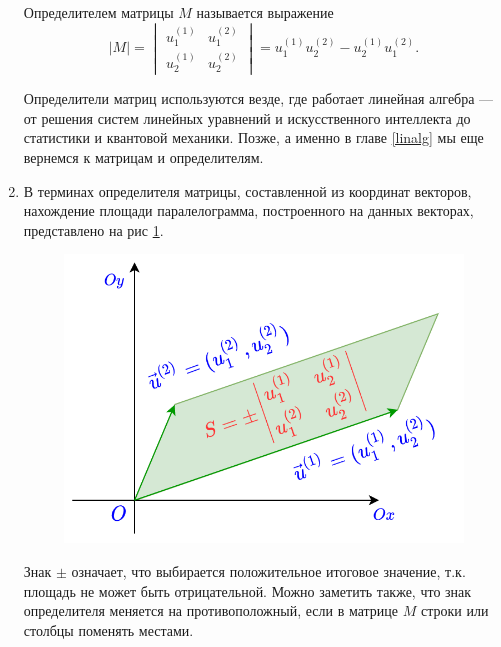 \begin{enumerate}
Определителем матрицы $M$ называется выражение
$$
|M| =
\begin{vmatrix}
u_1^{(1)} & u_1^{(2)} \\
u_2^{(1)} & u_2^{(2)}
\end{vmatrix} = u^{(1)}_1u^{(2)}_2-u^{(1)}_2u^{(2)}_1.
$$

Определители матриц используются везде, где работает линейная алгебра --- от решения систем линейных уравнений и искусственного интеллекта до статистики и квантовой механики. Позже, а именно в главе \ref{linalg} мы еще вернемся к матрицам и определителям.

\item В терминах определителя матрицы, составленной из координат векторов, нахождение площади паралелограмма, построенного на данных векторах, представлено на рис \ref{paralel2}.
\begin{figure}[hbt!]
\begin{center}
\includegraphics[scale=0.4]{paralel2.png}
\end{center}
\caption{}\label{paralel2}
\end{figure}

Знак $\pm$ означает, что выбирается положительное итоговое значение, т.к. площадь не может быть отрицательной. Можно заметить также, что знак определителя меняется на противоположный, если в матрице $M$ строки или столбцы поменять местами.


\end{enumerate}
